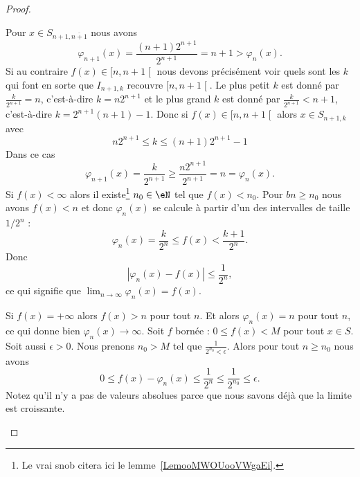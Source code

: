 \begin{proof}
\begin{subproof}
		Pour \( x\in S_{n+1,\overline{ n+1 }}\) nous avons
		\begin{equation}
			\varphi_{n+1}(x)=\frac{ (n+1)2^{n+1} }{ 2^{n+1} }=n+1>\varphi_n(x).
		\end{equation}
		Si au contraire \( f(x)\in\mathopen[ n , n+1 \mathclose[ \) nous devons précisément voir quels sont les \( k\) qui font en sorte que \( I_{n+1,k}\) recouvre \( \mathopen[ n , n+1 \mathclose[\). Le plus petit \( k\) est donné par \( \frac{ k }{ 2^{n+1} }=n\), c'est-à-dire \( k=n2^{n+1}\) et le plus grand \( k\) est donné par \( \frac{ k }{ 2^{n+1} }<n+1\), c'est-à-dire \( k=2^{n+1}(n+1)-1\). Donc si \( f(x)\in\mathopen[ n , n+1 \mathclose[\) alors \( x\in S_{n+1,k}\) avec
		\begin{equation}
			n2^{n+1}\leq k\leq (n+1)2^{n+1}-1
		\end{equation}
		Dans ce cas
		\begin{equation}
			\varphi_{n+1}(x)=\frac{ k }{ 2^{n+1} }\geq \frac{ n2^{n+1} }{ 2^{n+1} }=n=\varphi_n(x).
		\end{equation}
		Si \( f(x)<\infty\) alors il existe\footnote{Le vrai snob citera ici le lemme~\ref{LemooMWOUooVWgaEi}.} \( n_0\in\eN\) tel que \( f(x)<n_0\). Pour \( bn\geq n_0\) nous avons \( f(x)<n\) et donc \( \varphi_n(x)\) se calcule à partir d'un des intervalles de taille \( 1/2^n\) :
		\begin{equation}
			\varphi_n(x)=\frac{ k }{ 2^n }\leq f(x)<\frac{ k+1 }{ 2^n }.
		\end{equation}
		Donc
		\begin{equation}
			| \varphi_n(x)-f(x) |\leq \frac{1}{ 2^n },
		\end{equation}
		ce qui signifie que \( \lim_{n\to \infty} \varphi_n(x)=f(x)\).

		Si \( f(x)=+\infty\) alors \( f(x)>n\) pour tout \( n\). Et alors \( \varphi_n(x)=n\) pour tout \( n\), ce qui donne bien \( \varphi_n(x)\to \infty\).
		Soit \( f\) bornée : \( 0\leq f(x)<M\) pour tout \( x\in S\). Soit aussi \( \epsilon>0\). Nous prenons \( n_0>M\) tel que \( \frac{1}{ 2^{n_0}<\epsilon }\). Alors pour tout \( n\geq n_0\) nous avons
		\begin{equation}
			0\leq f(x)-\varphi_n(x)\leq \frac{1}{ 2^n }\leq \frac{1}{ 2^{n_0} }\leq \epsilon.
		\end{equation}
		Notez qu'il n'y a pas de valeurs absolues parce que nous savons déjà que la limite est croissante.
	\end{subproof}
\end{proof}

